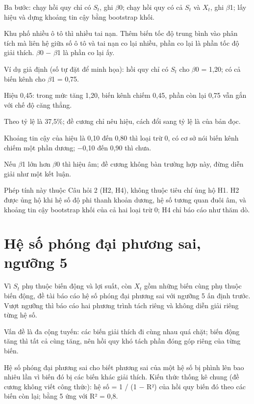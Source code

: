 Ba bước: chạy hồi quy chỉ có \(S_{t}\), ghi \texorpdfstring{$\beta$}{beta}0; chạy hồi quy có cả \(S_{t}\) và \(X_{t}\), ghi \texorpdfstring{$\beta$}{beta}1; lấy hiệu và dựng khoảng tin cậy bằng bootstrap khối.

Khu phố nhiều ô tô thì nhiều tai nạn. Thêm biến tốc độ trung bình vào phân tích mà liên hệ giữa số ô tô và tai nạn co lại nhiều, phần co lại là phần tốc độ giải thích. \texorpdfstring{$\beta$}{beta}0 − \texorpdfstring{$\beta$}{beta}1 là phần co lại ấy.

\begin{tcolorbox}[breakable]
Ví dụ giả định (số tự đặt để minh họa): hồi quy chỉ có \(S_{t}\) cho \texorpdfstring{$\beta$}{beta}0 = 1,20; có cả biến kênh cho \texorpdfstring{$\beta$}{beta}1 = 0,75.

Hiệu 0,45: trong mức tăng 1,20, biến kênh chiếm 0,45, phần còn lại 0,75 vẫn gắn với chế độ căng thẳng.

Theo tỷ lệ là 37,5\%; đề cương chỉ nêu hiệu, cách đổi sang tỷ lệ là của bản đọc.

Khoảng tin cậy của hiệu là 0,10 đến 0,80 thì loại trừ 0, có cơ sở nói biến kênh chiếm một phần dương; −0,10 đến 0,90 thì chưa.
\end{tcolorbox}

Nếu \texorpdfstring{$\beta$}{beta}1 lớn hơn \texorpdfstring{$\beta$}{beta}0 thì hiệu âm; đề cương không bàn trường hợp này, đừng diễn giải như một kết luận.

Phép tính này thuộc Câu hỏi 2 (H2, H4), không thuộc tiêu chí ủng hộ H1. H2 được ủng hộ khi hệ số độ phi thanh khoản dương, hệ số tương quan đuôi âm, và khoảng tin cậy bootstrap khối của cả hai loại trừ 0; H4 chỉ báo cáo như thăm dò.

\section{Hệ số phóng đại phương sai, ngưỡng 5}

Vì \(S_{t}\) phụ thuộc biến động và lợi suất, còn \(X_{t}\) gồm những biến cùng phụ thuộc biến động, đề tài báo cáo hệ số phóng đại phương sai với ngưỡng 5 ấn định trước. Vượt ngưỡng thì báo cáo hai phương trình tách riêng và không diễn giải riêng từng hệ số.

Vấn đề là đa cộng tuyến: các biến giải thích đi cùng nhau quá chặt; biến động tăng thì tất cả cùng tăng, nên hồi quy khó tách phần đóng góp riêng của từng biến.

Hệ số phóng đại phương sai cho biết phương sai của một hệ số bị phình lên bao nhiêu lần vì biến đó bị các biến khác giải thích. Kiến thức thống kê chung (đề cương không viết công thức): hệ số = 1 / (1 − R²) của hồi quy biến đó theo các biến còn lại; bằng 5 ứng với R² = 0,8.

